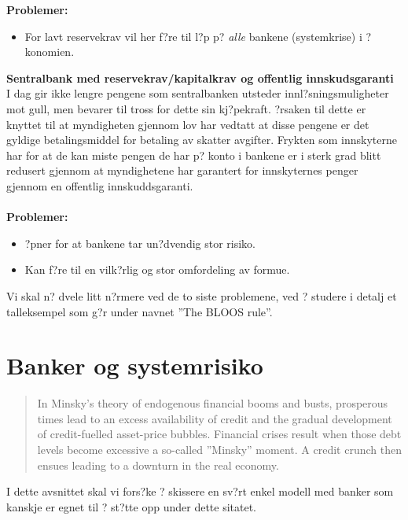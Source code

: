 \documentclass[a4paper,notitlepage]{article}
\begin{document}
\noindent\textbf{Problemer:}\\
\begin{itemize}
\item For lavt reservekrav vil her f?re til l?p p? \emph{alle} bankene (systemkrise) i ?konomien.
\end{itemize}

\noindent\textbf{Sentralbank med reservekrav/kapitalkrav og offentlig innskudsgaranti}\\
\noindent I dag gir ikke lengre pengene som sentralbanken utsteder innl?sningsmuligheter mot gull, men bevarer til tross for dette sin kj?pekraft.  ?rsaken til dette er knyttet til at myndigheten gjennom lov har vedtatt at disse pengene er det gyldige betalingsmiddel for betaling av skatter avgifter. Frykten som innskyterne har for at de kan miste pengen de har p? konto i bankene er i sterk grad blitt redusert gjennom at myndighetene har garantert for innskyternes penger gjennom en offentlig innskuddsgaranti. \\
\noindent\textbf{\\Problemer:}\\
\begin{itemize}
\item ?pner for at bankene tar un?dvendig stor risiko.
\item Kan f?re til en vilk?rlig og stor omfordeling av formue.
\end{itemize}
Vi skal n? dvele litt n?rmere ved de to siste problemene, ved ? studere i detalj et talleksempel som g?r under navnet ''The BLOOS rule''.
\section{Banker og systemrisiko}
\begin{quotation}
In Minsky's theory of endogenous financial booms and busts, prosperous
times lead to an excess availability of credit and the gradual development of credit-fuelled asset-price bubbles.  Financial crises result when those debt levels become excessive a so-called ''Minsky'' moment.  A credit crunch then ensues leading to a downturn in the real economy.
\end{quotation}
I dette avsnittet skal vi fors?ke ? skissere en sv?rt enkel modell med banker som kanskje er egnet til ? st?tte opp under dette sitatet.
\end{document}
